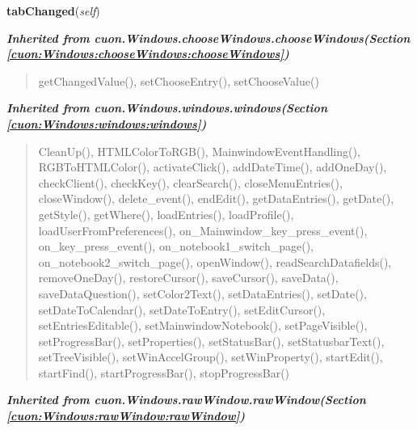     \label{cuon:SupportTicket:supportTicket:supportticketwindow:tabChanged}

    \vspace{0.5ex}

\hspace{.8\funcindent}\begin{boxedminipage}{\funcwidth}

    \raggedright \textbf{tabChanged}(\textit{self})

\setlength{\parskip}{2ex}
\setlength{\parskip}{1ex}
    \end{boxedminipage}


\large{\textbf{\textit{Inherited from cuon.Windows.chooseWindows.chooseWindows\textit{(Section \ref{cuon:Windows:chooseWindows:chooseWindows})}}}}

\begin{quote}
getChangedValue(), setChooseEntry(), setChooseValue()
\end{quote}

\large{\textbf{\textit{Inherited from cuon.Windows.windows.windows\textit{(Section \ref{cuon:Windows:windows:windows})}}}}

\begin{quote}
CleanUp(), HTMLColorToRGB(), MainwindowEventHandling(), RGBToHTMLColor(), activateClick(), addDateTime(), addOneDay(), checkClient(), checkKey(), clearSearch(), closeMenuEntries(), closeWindow(), delete\_event(), endEdit(), getDataEntries(), getDate(), getStyle(), getWhere(), loadEntries(), loadProfile(), loadUserFromPreferences(), on\_Mainwindow\_key\_press\_event(), on\_key\_press\_event(), on\_notebook1\_switch\_page(), on\_notebook2\_switch\_page(), openWindow(), readSearchDatafields(), removeOneDay(), restoreCursor(), saveCursor(), saveData(), saveDataQuestion(), setColor2Text(), setDataEntries(), setDate(), setDateToCalendar(), setDateToEntry(), setEditCursor(), setEntriesEditable(), setMainwindowNotebook(), setPageVisible(), setProgressBar(), setProperties(), setStatusBar(), setStatusbarText(), setTreeVisible(), setWinAccelGroup(), setWinProperty(), startEdit(), startFind(), startProgressBar(), stopProgressBar()
\end{quote}

\large{\textbf{\textit{Inherited from cuon.Windows.rawWindow.rawWindow\textit{(Section \ref{cuon:Windows:rawWindow:rawWindow})}}}}

